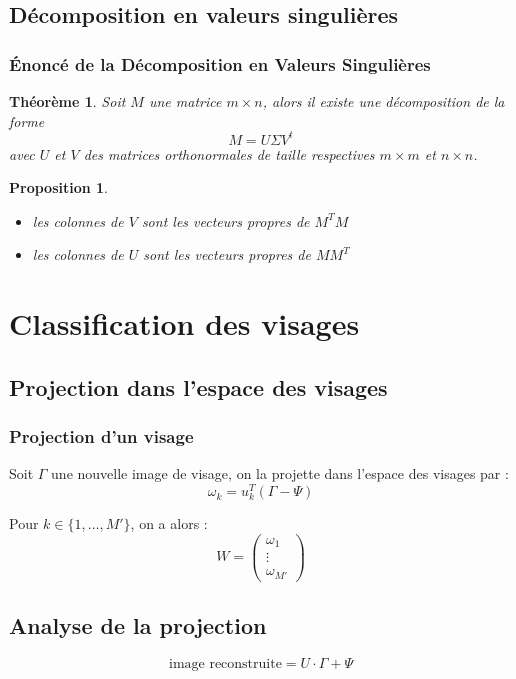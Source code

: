 \documentclass{beamer}
\theoremstyle{plain}
\newtheorem{thm}{Théorème}
\newtheorem{prop}{Proposition}
\theoremstyle{definition}
\begin{document}
\subsection{Décomposition en valeurs singulières}
\begin{frame}
  \frametitle{\'{E}noncé de la Décomposition en Valeurs Singulières}
  \begin{thm}
    Soit $M$ une matrice $m \times n$, alors il existe une décomposition de la forme
    \[
      M = U \Sigma V^t
    \]
    avec $U$ et $V$ des matrices orthonormales de taille respectives $m \times m$ et $n \times n$.
  \end{thm}
  
  \begin{prop}
    \begin{itemize}
    \item les colonnes de $V$ sont les vecteurs propres de $M^TM$
    \item les colonnes de $U$ sont les vecteurs propres de $MM^T$
    \end{itemize}
  \end{prop}
\end{frame}


\section{Classification des visages}
\subsection{Projection dans l'espace des visages}
\begin{frame}
  \frametitle{Projection d'un visage}
  Soit $\Gamma$ une nouvelle image de visage, on la projette dans l'espace des visages par :
  \[
    \omega_k = u_k^T(\Gamma - \Psi)
  \]
  
  \pause

  Pour $k \in \{1,\dotsc,M'\}$, on a alors :
  \[W =
    \begin{pmatrix}
      \omega_1 \\
      \vdots \\
      \omega_{M'}
    \end{pmatrix}
  \]
\end{frame}



\subsection{Analyse de la projection}
\begin{frame}
  \[
    \text{image reconstruite} = U \cdot \Gamma + \Psi
  \]
\end{frame}
\end{document}

